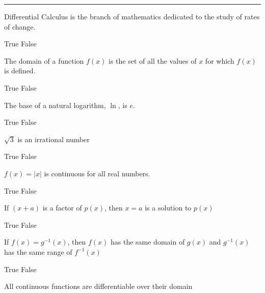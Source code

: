 \documentclass[legalpaper, 12pt, addpoints]{exam}
\begin{document}
\vspace{0.15in}
\hrule 
\vspace{0.1in}
\begin{questions}

\question Differential Calculus is the branch of mathematics dedicated to the study of rates of change.

\begin{oneparchoices}
    \CorrectChoice True
    \choice False
\end{oneparchoices}

\question The domain of a function \(f(x)\) is the set of all the values of \(x\) for which \(f(x)\) is defined.

\begin{oneparchoices}
    \CorrectChoice True
    \choice False
\end{oneparchoices}

\question The base of a natural logarithm, \(\ln\),  is \(e\).

\begin{oneparchoices}
    \CorrectChoice True
    \choice False
\end{oneparchoices}

\question $\sqrt{3}$ is an irrational number 

\begin{oneparchoices}
    \CorrectChoice True
    \choice False
\end{oneparchoices}

\question $f(x) = |x|$ is continuous for all real numbers.

\begin{oneparchoices}
    \CorrectChoice True
    \choice False
\end{oneparchoices}

\question  If $(x+a)$ is a factor of \(p(x)\), then $x=a$ is a solution to $p(x)$ 

\begin{oneparchoices}
    \choice True
    \CorrectChoice False
\end{oneparchoices}


\question  If  $f(x)=g^{-1}(x)$, then $f(x)$ has the same domain of  $g(x)$ and $g^{-1}(x)$ has the same range of $f^{-1}(x)$

\begin{oneparchoices}
    \choice True
    \CorrectChoice False
\end{oneparchoices}

\question  All continuous functions are differentiable over their domain


\end{questions}
\end{document}
